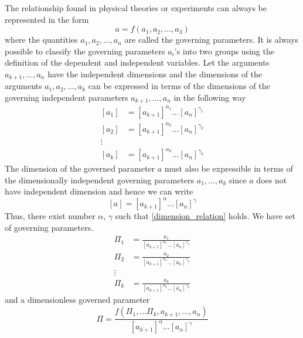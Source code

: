 The relationship found in physical theories or experiments can always be represented in the form
\begin{equation}
a = f (a_1, a_2, \ldots, a_3)
\label{def:governed_governing}
\end{equation}
where the quantities $a_1, a_2, \ldots, a_n$ are called the governing parameters. It is always possible to classify the governing parameters $a_i$'s into two groups using the definition of the dependent and independent variables. Let the arguments $a_{k+1},\ldots,a_n$ have the independent dimensions and the dimensions of the arguments $a_1, a_2, \ldots, a_k$ can be expressed in terms of the dimensions of the governing independent parameters $a_{k+1}, \ldots, a_n$ in the following way
\begin{align}
	\left[a_1\right] &= \left[a_{k+1}\right]^{\alpha_1} 
	\ldots \left[a_n\right]^{\gamma_1} \nonumber\\
	\left[a_2\right] &= \left[a_{k+1}\right]^{\alpha_2} \ldots \left[a_n\right]^{\gamma_2}\\
	\vdots \\
	\left[a_k\right] &= \left[a_{k+1}\right]^{\alpha_k} \ldots \left[a_n\right]^{\gamma_k} \nonumber
\end{align}
The dimension of the governed parameter $a$ must also be expressible in terms of the dimensionally independent governing parameters $a_1, \ldots, a_k$ since $a$ does not have independent dimension and hence we can write
\begin{equation}
	\left[a\right] = \left[a_{k+1}\right]^{\alpha} \ldots \left[a_n\right]^{\gamma}
	\label{dimension_relation}
\end{equation}
Thus, there exist number $\alpha$, $\gamma$ such that \ref{dimension_relation} holds. We have set of governing parameters.
\begin{align}
	\Pi_1 &= \frac{a_1}{\left[a_{k+1}\right]^{\alpha_1} \ldots \left[a_{n}\right]^{\gamma_1}} \\
	\Pi_2 &= \frac{a_2}{\left[a_{k+1}\right]^{\alpha_2} \ldots \left[a_{n}\right]^{\gamma_2}} \\
	\vdots \\
	\Pi_k &= \frac{a_k}{\left[a_{k+1}\right]^{\alpha_k} \ldots \left[a_{n}\right]^{\gamma_k}}
\end{align}
and a dimensionless governed parameter
\begin{equation}
\Pi = \frac{f(\Pi_1, \ldots \Pi_k, a_{k+1}, \ldots, a_n)}{\left[a_{k+1}\right]^{\alpha} \ldots \left[a_n\right]^{\gamma}}
\label{dimensionless-pi-1}
\end{equation}
